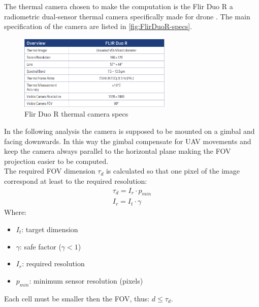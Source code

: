 The thermal camera chosen to make the computation is the Flir Duo R a radiometric dual-sensor thermal camera specifically made for drone \cite{flir:DuoR}. The main specification of the camera are listed in \autoref{fig:FlirDuoR-specs}.\\
\begin{figure}[ht]
    \centering
    \includegraphics[width=0.65\textwidth]{figures/C3/FlirDuoR-specs.png}
    \caption{Flir Duo R thermal camera specs \cite{flir:DuoR}}
    \label{fig:FlirDuoR-specs}
\end{figure}
In the following analysis the camera is supposed to be mounted on a gimbal and facing downwards. In this way the gimbal compensate for UAV movements and keep the camera always parallel to the horizontal plane making the FOV projection easier to be computed.\\
The required FOV dimension $\tau_d$ is calculated so that one pixel of the image correspond at least to the required resolution:
\begin{gather*}
\tau_d = I_r \cdot p_{min} \\
I_r = I_t \cdot \gamma
\end{gather*}
Where:
\begin{itemize}[noitemsep]
  \item[] $I_t$: target dimension 
  \item[] $\gamma$: safe factor ($\gamma < 1$)
  \item[] $I_r$: required resolution
  \item[] $p_{min}$: minimum sensor resolution (pixels)
\end{itemize}
Each cell must be smaller then the FOV, thus: $d \leq \tau_d$. \\


